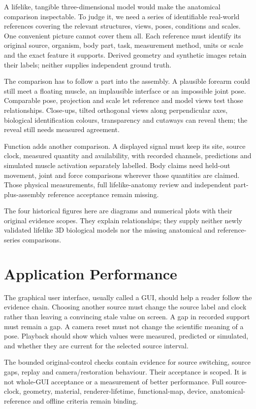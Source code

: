 A lifelike, tangible three-dimensional model would make the anatomical
comparison inspectable. To judge it, we need a series of identifiable real-world
references covering the relevant structures, views, poses, conditions and scales.
One convenient picture cannot cover them all. Each reference must identify its
original source, organism, body part, task, measurement method, units or scale
and the exact feature it supports. Derived geometry and synthetic images retain
their labels; neither supplies independent ground truth.

The comparison has to follow a part into the assembly. A plausible forearm
could still meet a floating muscle, an implausible interface or an impossible
joint pose. Comparable pose, projection and scale let reference and model views
test those relationships. Close-ups, tilted orthogonal views along perpendicular
axes, biological identification colours, transparency and cutaways can reveal
them; the reveal still needs measured agreement.

Function adds another comparison. A displayed signal must keep its site, source
clock, measured quantity and availability, with recorded channels, predictions
and simulated muscle activation separately labelled. Body claims need held-out
movement, joint and force comparisons wherever those quantities are claimed.
Those physical measurements, full lifelike-anatomy review and independent
part-plus-assembly reference acceptance remain missing.

The four historical figures here are diagrams and numerical plots with their
original evidence scopes. They explain relationships; they supply neither
newly validated lifelike 3D biological models nor the missing anatomical and
reference-series comparisons.

\section{Application Performance}

The graphical user interface, usually called a GUI, should help a reader follow
the evidence chain. Choosing another source must change the source label and
clock rather than leaving a convincing stale value on screen. A gap in recorded
support must remain a gap. A camera reset must not change the scientific meaning
of a pose. Playback should show which values were measured, predicted or
simulated, and whether they are current for the selected source interval.

The bounded original-control checks contain evidence for source switching,
source gaps, replay and camera/restoration behaviour. Their acceptance is scoped.
It is not whole-GUI acceptance or a measurement of better performance. Full
source-clock, geometry, material, renderer-lifetime, functional-map, device,
anatomical-reference and offline criteria remain binding.

